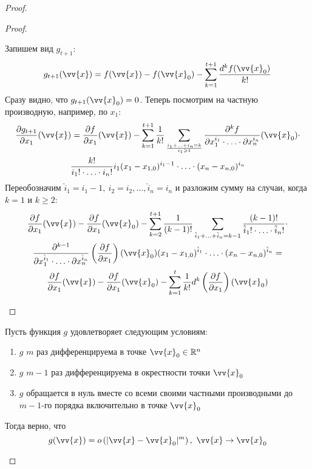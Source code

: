 \begin{proof}
\begin{proof}
\begin{itemize}
			Запишем вид $g_{t + 1}$:
			\[
				g_{t + 1}(\vv{x}) = f(\vv{x}) - f(\vv{x}_0) - \suml_{k = 1}^{t + 1} \frac{d^k f(\vv{x}_0)}{k!}
			\]
			Сразу видно, что $g_{t + 1} (\vv{x}_0) = 0$. Теперь посмотрим на частную производную, например, по $x_1$:
			\begin{multline*}
				\pd{g_{t + 1}}{x_1} (\vv{x}) = \pd{f}{x_1} (\vv{x}) - \suml_{k = 1}^{t + 1} \frac{1}{k!} \suml_{i_1 + \ldots + i_n = k \over i_1 \ge 1} \frac{\vdelta^k f}{\vdelta x_1^{i_1} \cdot \ldots \cdot \vdelta x_n^{i_n}} (\vv{x}_0) \cdot
				\\
				\frac{k!}{i_1! \cdot \ldots \cdot i_n!} i_1 (x_1 - x_{1, 0})^{i_1 - 1} \cdot \ldots \cdot (x_n - x_{n, 0})^{i_n}
			\end{multline*}
			Переобозначим $\hat{i}_1 = i_1 - 1,\ \hat{i}_2 = i_2,\ldots, \hat{i}_n = i_n$ и разложим сумму на случаи, когда $k = 1$ и $k \ge 2$:
			\begin{multline*}
				\pd{f}{x_1} (\vv{x}) - \pd{f}{x_1} (\vv{x}_0) - \suml_{k = 2}^{t + 1} \frac{1}{(k - 1)!} \suml_{\hat{i}_1 + \ldots + \hat{i}_n = k - 1} \frac{(k - 1)!}{\hat{i}_1! \cdot \ldots \cdot \hat{i}_n!} \cdot
				\\
				\frac{\vdelta^{k - 1}}{\vdelta x_1^{\hat{i}_1} \cdot \ldots \cdot \vdelta x_n^{\hat{i}_n}} \left(\pd{f}{x_1}\right) (\vv{x}_0) (x_1 - x_{1, 0})^{\hat{i}_1} \cdot \ldots \cdot (x_n - x_{n, 0})^{\hat{i}_n} =
				\\
				\pd{f}{x_1} (\vv{x}) - \pd{f}{x_1} (\vv{x}_0) - \suml_{k = 1}^t \frac{1}{k!} d^k \left(\pd{f}{x_1}\right) (\vv{x}_0)
			\end{multline*}
		\end{itemize}
	\end{proof}
	\begin{lemma}
		Пусть функция $g$ удовлетворяет следующим условиям:
		\begin{enumerate}
			\item $g$ $m$ раз дифференцируема в точке $\vv{x}_0 \in \R^n$
			
			\item $g$ $m - 1$ раз дифференцируема в окрестности точки $\vv{x}_0$
			
			\item $g$ обращается в нуль вместе со всеми своими частными производными до $m - 1$-го порядка включительно в точке $\vv{x}_0$
		\end{enumerate}
		Тогда верно, что
		\[
			g(\vv{x}) = o\left(|\vv{x} - \vv{x}_0|^m\right),\ \vv{x} \to \vv{x}_0
		\]
	\end{lemma}
	

\end{proof}
